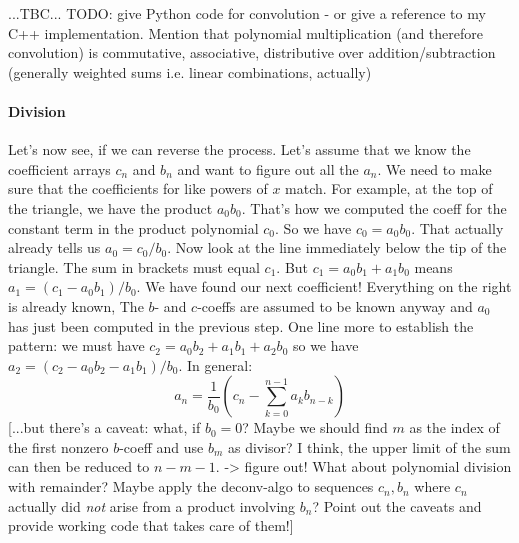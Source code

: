 ...TBC... TODO: give Python code for convolution - or give a reference to my C++ implementation. Mention that polynomial multiplication (and therefore convolution) is commutative, associative, distributive over addition/subtraction (generally weighted sums i.e. linear combinations, actually)




\paragraph{Division}
Let's now see, if we can reverse the process. Let's assume that we know the coefficient arrays $c_n$ and $b_n$ and want to figure out all the $a_n$. We need to make sure that the coefficients for like powers of $x$ match. For example, at the top of the triangle, we have the product $a_0 b_0$. That's how we computed the coeff for the constant term in the product polynomial $c_0$. So we have $c_0 = a_0 b_0$. That actually already tells us $a_0 = c_0 / b_0$. Now look at the line immediately below the tip of the triangle. The sum in brackets must equal $c_1$. But $c_1 = a_0 b_1 + a_1 b_0$ means $a_1 = (c_1 -a_0 b_1)/b_0$. We have found our next coefficient! Everything on the right is already known, The $b$- and $c$-coeffs are assumed to be known anyway and $a_0$ has just been computed in the previous step. One line more to establish the pattern: we must have $c_2 = a_0 b_2 + a_1 b_1 + a_2 b_0$ so we have $a_2 = (c_2 - a_0 b_2 - a_1 b_1)/b_0$. In general:
\begin{equation}
a_n = \frac{1}{b_0} (  c_n - \sum_{k=0}^{n-1} a_k b_{n-k} ) 
\end{equation}
[...but there's a caveat: what, if $b_0 = 0$? Maybe we should find $m$ as the index of the first nonzero $b$-coeff and use $b_m$ as divisor? I think, the upper limit of the sum can then be reduced to $n-m-1$. -> figure out! What about polynomial division with remainder? Maybe apply the deconv-algo to sequences $c_n, b_n$ where $c_n$ actually did \emph{not} arise from a product involving $b_n$? Point out the caveats and provide working code that takes care of them!]

